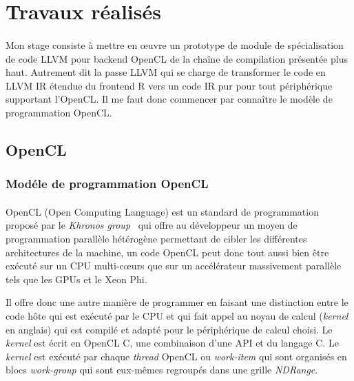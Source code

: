 \section{Travaux réalisés}
\paragraph{}
Mon stage consiste à mettre en \oe{}uvre un prototype de module de
spécialisation de code LLVM pour backend OpenCL de la chaîne de compilation
présentée plus haut. Autrement dit la passe LLVM qui se charge de transformer le
code en LLVM IR étendue du frontend R vers un code IR pur pour tout périphérique
supportant l'OpenCL. Il me faut donc commencer par connaître le modèle de
programmation OpenCL.

\subsection{OpenCL}
\subsubsection{Modéle de programmation OpenCL}
\paragraph{}
OpenCL (Open Computing Language) est un standard de programmation proposé par le
\emph{Khronos group}~\cite{opencl} qui offre au développeur un moyen de
programmation parallèle hétérogène permettant de cibler les différentes
architectures de la machine, un code OpenCL peut donc tout aussi bien être
exécuté sur un CPU multi-c\oe{}urs que sur un accélérateur massivement parallèle
tels que les GPUs et le Xeon Phi.

Il offre donc une autre manière de programmer en faisant une distinction entre
le code hôte qui est exécuté par le CPU et qui fait appel au noyau de calcul
(\emph{kernel} en anglais) qui est compilé et adapté pour le périphérique de
calcul choisi. Le \emph{kernel} est écrit en OpenCL C, une combinaison d'une API
et du langage C. Le \emph{kernel} est exécuté par chaque \emph{thread} OpenCL ou
\emph{work-item} qui sont organisés en blocs \emph{work-group} qui sont
eux-mêmes regroupés dans une grille \emph{NDRange}.


